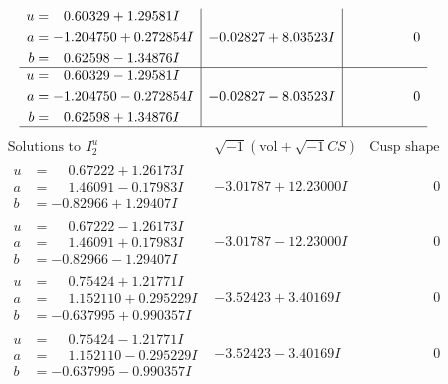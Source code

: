 \documentclass[1p]{elsarticle_modified}
\theoremstyle{definition}
\newcommand{\I}{\sqrt{-1}}
\begin{document}
$$\begin{array}{c|c|c}
\begin{aligned}
u &= \phantom{-}0.60329 + 1.29581 I \\
a &= -1.204750 + 0.272854 I \\
b &= \phantom{-}0.62598 - 1.34876 I\end{aligned}
 & -0.02827 + 8.03523 I & \phantom{-0.000000 } 0 \\ \hline\begin{aligned}
u &= \phantom{-}0.60329 - 1.29581 I \\
a &= -1.204750 - 0.272854 I \\
b &= \phantom{-}0.62598 + 1.34876 I\end{aligned}
 & -0.02827 - 8.03523 I & \phantom{-0.000000 } 0\\
 \hline 
 \end{array}$$\newpage$$\begin{array}{c|c|c}  
\text{Solutions to }I^u_{2}& \I (\text{vol} + \sqrt{-1}CS) & \text{Cusp shape}\\
 \hline 
\begin{aligned}
u &= \phantom{-}0.67222 + 1.26173 I \\
a &= \phantom{-}1.46091 - 0.17983 I \\
b &= -0.82966 + 1.29407 I\end{aligned}
 & -3.01787 + 12.23000 I & \phantom{-0.000000 } 0 \\ \hline\begin{aligned}
u &= \phantom{-}0.67222 - 1.26173 I \\
a &= \phantom{-}1.46091 + 0.17983 I \\
b &= -0.82966 - 1.29407 I\end{aligned}
 & -3.01787 - 12.23000 I & \phantom{-0.000000 } 0 \\ \hline\begin{aligned}
u &= \phantom{-}0.75424 + 1.21771 I \\
a &= \phantom{-}1.152110 + 0.295229 I \\
b &= -0.637995 + 0.990357 I\end{aligned}
 & -3.52423 + 3.40169 I & \phantom{-0.000000 } 0 \\ \hline\begin{aligned}
u &= \phantom{-}0.75424 - 1.21771 I \\
a &= \phantom{-}1.152110 - 0.295229 I \\
b &= -0.637995 - 0.990357 I\end{aligned}
 & -3.52423 - 3.40169 I & \phantom{-0.000000 } 0 \\ \hline\begin{aligned}

\end{aligned}
\end{array}$$
\end{document}
